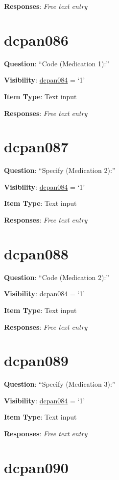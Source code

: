 \documentclass[]{book}
\begin{document}
\textbf{Responses}: \emph{Free text entry}

\hypertarget{dcpan086}{%
\section{dcpan086}\label{dcpan086}}

\textbf{Question}: ``Code (Medication 1):''

\textbf{Visibility}: \protect\hyperlink{dcpan084}{dcpan084} = `1'

\textbf{Item Type}: Text input

\textbf{Responses}: \emph{Free text entry}

\hypertarget{dcpan087}{%
\section{dcpan087}\label{dcpan087}}

\textbf{Question}: ``Specify (Medication 2):''

\textbf{Visibility}: \protect\hyperlink{dcpan084}{dcpan084} = `1'

\textbf{Item Type}: Text input

\textbf{Responses}: \emph{Free text entry}

\hypertarget{dcpan088}{%
\section{dcpan088}\label{dcpan088}}

\textbf{Question}: ``Code (Medication 2):''

\textbf{Visibility}: \protect\hyperlink{dcpan084}{dcpan084} = `1'

\textbf{Item Type}: Text input

\textbf{Responses}: \emph{Free text entry}

\hypertarget{dcpan089}{%
\section{dcpan089}\label{dcpan089}}

\textbf{Question}: ``Specify (Medication 3):''

\textbf{Visibility}: \protect\hyperlink{dcpan084}{dcpan084} = `1'

\textbf{Item Type}: Text input

\textbf{Responses}: \emph{Free text entry}

\hypertarget{dcpan090}{%
\section{dcpan090}\label{dcpan090}}
\end{document}
